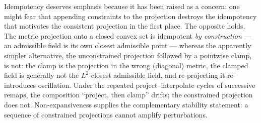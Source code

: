 \documentclass[11pt]{article}
\begin{document}
Idempotency deserves emphasis because it has been raised as a concern:
one might fear that appending constraints to the projection destroys the
idempotency that motivates the consistent projection in the first place.
The opposite holds. The metric projection onto a closed convex set is
idempotent \emph{by construction} --- an admissible field is its own
closest admissible point --- whereas the apparently simpler alternative,
the unconstrained projection followed by a pointwise clamp, is not: the
clamp is the projection in the wrong (diagonal) metric, the clamped field
is generally not the $L^2$-closest admissible field, and re-projecting it
re-introduces oscillation. Under the repeated project--interpolate cycles
of successive remaps, the composition ``project, then clamp'' drifts; the
constrained projection does not. Non-expansiveness supplies the
complementary stability statement: a sequence of constrained projections
cannot amplify perturbations.
\end{document}
